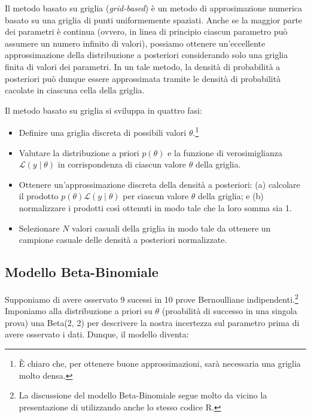 \documentclass[
]{memoir}
\providecommand{\tightlist}{%
  \setlength{\itemsep}{0pt}\setlength{\parskip}{0pt}}
\newcommand{\R}{\textsf{R}} %
\begin{document}
Il metodo basato su griglia (\emph{grid-based}) è un metodo di approsimazione numerica basato su una griglia di punti uniformemente spaziati. Anche se la maggior parte dei parametri è continua (ovvero, in linea di principio ciascun parametro può assumere un numero infinito di valori), possiamo ottenere un'eccellente approssimazione della distribuzione a posteriori considerando solo una griglia finita di valori dei parametri. In un tale metodo, la densità di probabilità a posteriori può dunque essere approssimata tramite le densità di probabilità cacolate in ciascuna cella della griglia.

Il metodo basato su griglia si sviluppa in quattro fasi:

\begin{itemize}
\tightlist
\item
  Definire una griglia discreta di possibili valori \(\theta\).\footnote{È chiaro che, per ottenere buone approssimazioni, sarà necessaria una griglia molto densa.}
\item
  Valutare la distribuzione a priori \(p(\theta)\) e la funzione di verosimiglianza \(\mathcal{L}(y \mid \theta)\) in corrispondenza di ciascun valore \(\theta\) della griglia.
\item
  Ottenere un'approssimazione discreta della densità a posteriori: (a) calcolare il prodotto \(p(\theta) \mathcal{L} (y \mid \theta)\) per ciascun
  valore \(\theta\) della griglia; e (b) normalizzare i prodotti così ottenuti in modo tale che la loro somma sia 1.
\item
  Selezionare \(N\) valori casuali della griglia in modo tale da ottenere un campione casuale delle densità a posteriori normalizzate.
\end{itemize}

\hypertarget{modello-beta-binomiale}{%
\subsection{Modello Beta-Binomiale}\label{modello-beta-binomiale}}

Supponiamo di avere osservato 9 sucessi in 10 prove Bernoulliane indipendenti.\footnote{La discussione del modello Beta-Binomiale segue molto da vicino la presentazione di \citet{Johnson2022bayesrules} utilizzando anche lo stesso codice \R.} Imponiamo alla distribuzione a priori su \(\theta\) (proabilità di successo in una singola prova) una Beta(2, 2) per descrivere la nostra incertezza sul parametro prima di avere osservato i dati. Dunque, il modello diventa:
\end{document}
